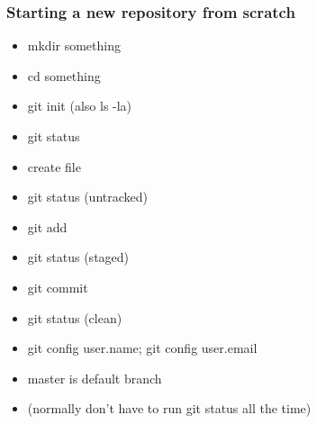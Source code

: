 \documentclass{git_course}
\begin{document}
\begin{frame}
\frametitle{Starting a new repository from scratch}
\begin{itemize}
    \item mkdir something
    \item cd something
    \item git init  (also ls -la)
    \item git status
    \item create file
    \item git status (untracked)
    \item git add
    \item git status (staged)
    \item git commit
    \item git status (clean)
    \item git config user.name; git config user.email
    \item master is default branch
    \item (normally don't have to run git status all the time)
\end{itemize}
\end{frame}
\end{document}
